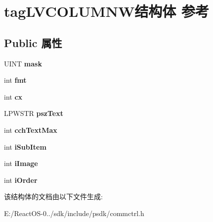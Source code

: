 \hypertarget{structtag_l_v_c_o_l_u_m_n_w}{}\section{tag\+L\+V\+C\+O\+L\+U\+M\+N\+W结构体 参考}
\label{structtag_l_v_c_o_l_u_m_n_w}
\subsection*{Public 属性}
\begin{DoxyCompactItemize}
\item 
\mbox{\label{structtag_l_v_c_o_l_u_m_n_w_aa5477773f9fcbcd479176e3bcbb14f19}} 
U\+I\+NT {\bfseries mask}
\item 
\mbox{\label{structtag_l_v_c_o_l_u_m_n_w_a817386a87ba32adf9e7352ab4e4a4df1}} 
int {\bfseries fmt}
\item 
\mbox{\label{structtag_l_v_c_o_l_u_m_n_w_a9cb31d9afeae84f59bb7b3bbf7bfb719}} 
int {\bfseries cx}
\item 
\mbox{\label{structtag_l_v_c_o_l_u_m_n_w_aa939fc083d5d5faa375e821fd174d840}} 
L\+P\+W\+S\+TR {\bfseries psz\+Text}
\item 
\mbox{\label{structtag_l_v_c_o_l_u_m_n_w_a581587fce527234b01f44498b37a0dd4}} 
int {\bfseries cch\+Text\+Max}
\item 
\mbox{\label{structtag_l_v_c_o_l_u_m_n_w_a62f6df0db93ae8bbf99f8a63e8c718cc}} 
int {\bfseries i\+Sub\+Item}
\item 
\mbox{\label{structtag_l_v_c_o_l_u_m_n_w_aaf53e867f2612cf2fe1c9429b061ff22}} 
int {\bfseries i\+Image}
\item 
\mbox{\label{structtag_l_v_c_o_l_u_m_n_w_aedeb56a38ac96bc2be18da02ddb08604}} 
int {\bfseries i\+Order}
\end{DoxyCompactItemize}


该结构体的文档由以下文件生成\+:\begin{DoxyCompactItemize}
\item 
E\+:/\+React\+O\+S-\/0../sdk/include/psdk/commctrl.\+h\end{DoxyCompactItemize}
